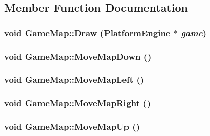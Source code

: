 \subsection{Member Function Documentation}
\hypertarget{class_game_map_c289ffedd32b98d2827e6b765b3e50d6}{
\subsubsection[{Draw}]{\setlength{\rightskip}{0pt plus 5cm}void GameMap::Draw ({\bf PlatformEngine} $\ast$ {\em game})}}
\label{d4/de2/class_game_map_c289ffedd32b98d2827e6b765b3e50d6}


\hypertarget{class_game_map_7466202e8f2bd3ae188ddcbd7e50a023}{
\subsubsection[{MoveMapDown}]{\setlength{\rightskip}{0pt plus 5cm}void GameMap::MoveMapDown ()}}
\label{d4/de2/class_game_map_7466202e8f2bd3ae188ddcbd7e50a023}


\hypertarget{class_game_map_90fe97ecdcee40995d8e5fa86857cf5c}{
\subsubsection[{MoveMapLeft}]{\setlength{\rightskip}{0pt plus 5cm}void GameMap::MoveMapLeft ()}}
\label{d4/de2/class_game_map_90fe97ecdcee40995d8e5fa86857cf5c}


\hypertarget{class_game_map_e76fd062e8e47331e7e999dbea0f0486}{
\subsubsection[{MoveMapRight}]{\setlength{\rightskip}{0pt plus 5cm}void GameMap::MoveMapRight ()}}
\label{d4/de2/class_game_map_e76fd062e8e47331e7e999dbea0f0486}


\hypertarget{class_game_map_e9b33ef01ca643a2389e7be0ebf838b1}{
\subsubsection[{MoveMapUp}]{\setlength{\rightskip}{0pt plus 5cm}void GameMap::MoveMapUp ()}}
\label{d4/de2/class_game_map_e9b33ef01ca643a2389e7be0ebf838b1}


